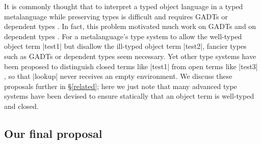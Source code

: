 It is commonly thought that to interpret a typed object language in
a typed metalanguage while preserving types is difficult and requires
GADTs or dependent types \citep{taha-tag}.  In fact, this problem
motivated much work on GADTs \citep{xi-guarded,peyton-jones-simple} and
on dependent types \citep{WalidICFP02,fogarty-concoqtion}.
\ifshort\else
For a metalanguage's type system to allow the well-typed object term
|test1| but disallow the ill-typed object term |test2|, fancier types
such as GADTs or dependent types seem necessary.  
\fi
Yet other type systems
have been proposed to distinguish closed terms like |test1| from open
terms 
\ifshort\citep{WalidPOPL03,NanevskiJFP05,DaviesJACM01}\else
like |test3|
\citep{WalidPOPL03,NanevskiICFP02,NanevskiJFP05,DaviesJACM01,nanevski-contextual}\fi,
so that |lookup| never receives an empty environment.  We discuss these
proposals further in \S\ref{related}\ifshort\else;
here we just note that many
advanced type systems have been devised to ensure statically that an
object term is well-typed and closed\fi.

\subsection{Our final proposal}\label{ourapproach}

